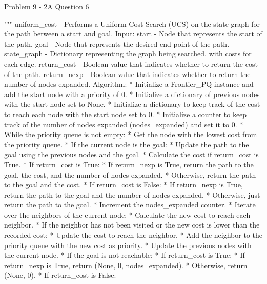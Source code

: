 \begin{problem}{Problem 9 - 2A Question 6}
\begin{highlight}[Solution]
\begin{code}[Python]
    """ uniform_cost - Performs a Uniform Cost Search (UCS) on the state graph for the path between a start and goal.
        Input:
            start - Node that represents the start of the path.
            goal - Node that represents the desired end point of the path.
            state_graph - Dictionary representing the graph being searched, with costs for each edge.
            return_cost - Boolean value that indicates whether to return the cost of the path.
            return_nexp - Boolean value that indicates whether to return the number of nodes expanded.
        Algorithm:
            * Initialize a Frontier_PQ instance and add the start node with a priority of 0.
            * Initialize a dictionary of previous nodes with the start node set to None.
            * Initialize a dictionary to keep track of the cost to reach each node with the start node set to 0.
            * Initialize a counter to keep track of the number of nodes expanded (nodes_expanded) and set it to 0.
            * While the priority queue is not empty:
                * Get the node with the lowest cost from the priority queue.
                * If the current node is the goal:
                    * Update the path to the goal using the previous nodes and the goal.
                    * Calculate the cost if return_cost is True.
                    * If return_cost is True:
                        * If return_nexp is True, return the path to the goal, the cost, and the number of nodes expanded.
                        * Otherwise, return the path to the goal and the cost.
                    * If return_cost is False:
                        * If return_nexp is True, return the path to the goal and the number of nodes expanded.
                        * Otherwise, just return the path to the goal.
                * Increment the nodes_expanded counter.
                * Iterate over the neighbors of the current node:
                    * Calculate the new cost to reach each neighbor.
                    * If the neighbor has not been visited or the new cost is lower than the recorded cost:
                        * Update the cost to reach the neighbor.
                        * Add the neighbor to the priority queue with the new cost as priority.
                        * Update the previous nodes with the current node.
            * If the goal is not reachable:
                * If return_cost is True:
                    * If return_nexp is True, return (None, 0, nodes_expanded).
                    * Otherwise, return (None, 0).
                * If return_cost is False:

\end{code}
\end{highlight}
\end{problem}
